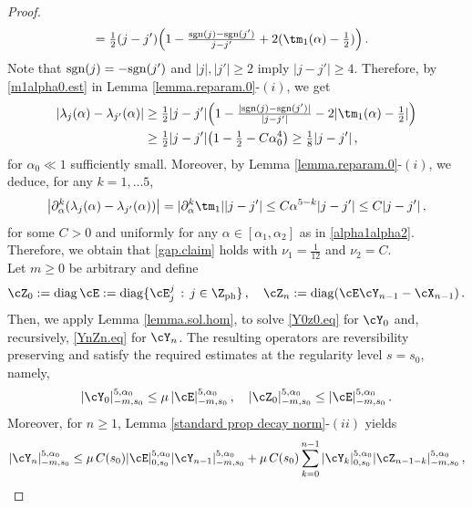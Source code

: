 \documentclass[a4paper,reqno,10pt]{article}
\newcommand{\pa}{\partial}
\begin{document}
\begin{proof}
\begin{align}
				& = \tfrac12(j-j')\Big( 1 - \tfrac{{\rm sgn}(j) -{\rm sgn}(j')}{j-j'} + 2 (\tm_{1}(\alpha)-\tfrac12) \Big) \,.
		\end{align}
		Note that ${\rm sgn}(j) = - {\rm sgn}(j') $ and $|j|, |j'|\geq 2$ imply $|j-j'|\geq 4$. Therefore, by \eqref{m1alpha0.est} in Lemma \eqref{lemma.reparam.0}-$(i)$, we get
		\begin{align}
				|\lambda_{j}(\alpha)-\lambda_{j'}(\alpha)| & \geq \tfrac12 |j-j'|\Big( 1 -  \tfrac{|{\rm sgn}(j) -{\rm sgn}(j')|}{|j-j'|} - 2 |\tm_{1}(\alpha)-\tfrac12| \Big)  \\
				& \geq \tfrac12 |j-j'| \big( 1 - \tfrac12 - C \alpha_{0}^4 \big) \geq \tfrac18 |j-j'|  \,,
		\end{align}
			for $\alpha_{0}\ll 1$ sufficiently small.  Moreover, by Lemma \ref{lemma.reparam.0}-$(i)$, we deduce, for any $k=1,...5$,
            \begin{align}
                \big|\pa_{\alpha}^k(\lambda_{j}(\alpha)-\lambda_{j'}(\alpha))\big| = |\pa_{\alpha}^k \tm_{1}| |j-j'| \leq C \alpha^{5-k} |j-j'| \leq C |j-j'| \,,
            \end{align}
            for some $C>0$ and uniformly for any $\alpha\in [\alpha_{1},\alpha_{2}]$ as in \eqref{alpha1alpha2}.
 	Therefore, we obtain that \eqref{gap.claim} holds with $\nu_{1}=\tfrac{1}{12}$ and $\nu_{2}=C$. 
 		\\[1mm]
 	Let $m\geq 0$ be arbitrary and define
 	\begin{equation}\label{Z0Zn.def}
 		\cZ_{0}:= {\rm diag} \,\cE :={\rm diag}\{ \cE_{j}^{j} \, : \, j \in \Z_{\rm ph} \} \,, \quad \cZ_{n} := {\rm diag} (\cE \cY_{n-1} -\cX_{n-1} )\,.
 	\end{equation}
    Then, we apply Lemma \ref{lemma.sol.hom},
 	to solve \eqref{Y0z0.eq} for $\cY_{0}$ and, recursively, \eqref{YnZn.eq} for $\cY_{n}$. The resulting operators are reversibility preserving and  satisfy the required estimates at the regularity level $s=s_0$, namely,
 	 	\begin{align}\label{low.Y0Z0}
 		|\cY_{0}|_{-m,s_0}^{5,\alpha_{0}} \leq \mu\, |\cE|_{-m,s_0}^{5,\alpha_{0}} \,, \quad 	|\cZ_{0}|_{-m,s_0}^{5,\alpha_{0}} \leq  |\cE|_{-m,s_0}^{5,\alpha_{0}} \,.
 	\end{align}
 	Moreover,  for $n\geq 1$,  Lemma \ref{standard prop decay norm}-$(ii)$ yields
 	\begin{align}
	|\cY_{n}|_{-m,s_0}^{5,\alpha_{0}} & \leq \mu\, C(s_0)  |\cE|_{0,s_0}^{5,\alpha_{0}}   |\cY_{n-1}|_{-m,s_0}^{5,\alpha_{0}}  + \mu\, C(s_0) \sum_{k=0}^{n-1}  |\cY_{k}|_{0,s_0}^{5,\alpha_{0}}   |\cZ_{n-1-k}|_{-m,s_0}^{5,\alpha_{0}} \,, \\

\end{align}
\end{proof}
\end{document}
